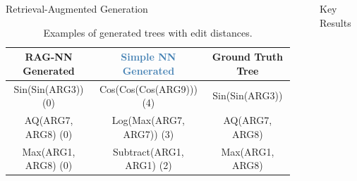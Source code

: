 \documentclass[final]{beamer}
\newcommand{\hlpurple}[1]{\textcolor{deepplum}{#1}}
\newcommand{\hlsteel}[1]{\textcolor{steelblue}{#1}}
\newlength{\sepwid}
\newlength{\onecolwid}
\begin{document}
\begin{frame}[t]
\begin{columns}[t]
\begin{column}{\onecolwid}
\begin{block}{Retrieval-Augmented Generation}
                    \begin{table}
                        \centering
                        \caption{Examples of generated trees with edit distances.}
                        \small
                        \begin{tabular}{ccc}
                            \toprule
                            \textbf{\hlpurple{RAG-NN Generated}} & \textbf{\hlsteel{Simple NN Generated}} & \textbf{Ground Truth Tree} \\
                            \midrule
                            Sin(Sin(ARG3)) (0)                   & Cos(Cos(Cos(ARG9))) (4)                & Sin(Sin(ARG3))             \\
                            AQ(ARG7, ARG8) (0)                   & Log(Max(ARG7, ARG7)) (3)               & AQ(ARG7, ARG8)             \\
                            Max(ARG1, ARG8) (0)                  & Subtract(ARG1, ARG1) (2)               & Max(ARG1, ARG8)            \\
                            \bottomrule
                        \end{tabular}
                    \end{table}
                \end{block}

            \end{column} %

            \begin{column}{\sepwid}\end{column} %

            \begin{column}{\onecolwid} %



                \begin{block}{Key Results}

                    \vspace{-5mm}


\end{block}
\end{column}
\end{columns}
\end{frame}
\end{document}
